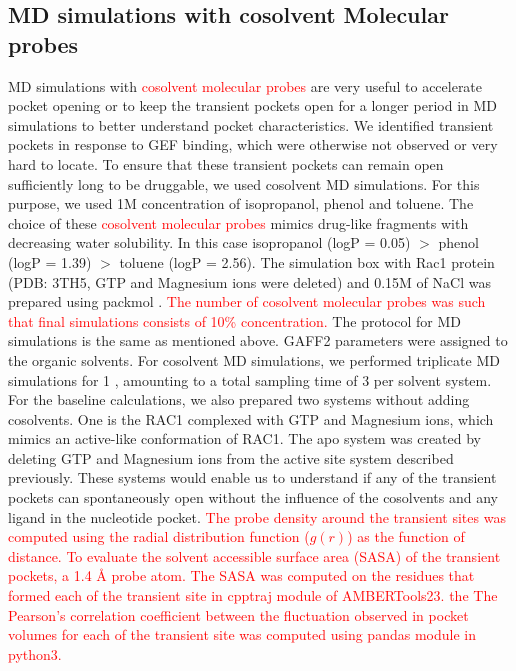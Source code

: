 \documentclass[12pt,a4paper]{achemso}
\begin{document}
\subsection{MD simulations with cosolvent Molecular probes} 
MD simulations with \textcolor{red}{cosolvent molecular probes} are very useful to accelerate pocket opening or to keep the transient pockets open for a longer period in MD simulations to better understand pocket characteristics. We identified transient pockets in response to GEF binding, which were otherwise not observed or very hard to locate. To ensure that these transient pockets can remain open sufficiently long to be druggable, we used cosolvent MD simulations. For this purpose, we used 1M concentration of isopropanol, phenol and toluene. The choice of these \textcolor{red}{cosolvent molecular probes} mimics drug-like fragments with decreasing water solubility. In this case isopropanol (logP = 0.05) $>$ phenol (logP = 1.39)  $>$ toluene (logP = 2.56). The simulation box with Rac1 protein (PDB: 3TH5, GTP and Magnesium ions were deleted) and 0.15M of NaCl was prepared using packmol \cite{martinez2009packmol}. \textcolor{red}{The number of cosolvent molecular probes was such that final simulations consists of 10\% concentration.} The protocol for MD simulations is the same as mentioned above. GAFF2 parameters were assigned to the organic solvents. For cosolvent MD simulations, we performed triplicate MD simulations for 1 ,  amounting to a total sampling time of 3  per solvent system. For the baseline calculations, we also prepared two systems without adding cosolvents.  One is the RAC1 complexed with GTP and Magnesium ions, which mimics an active-like conformation of RAC1. The apo system was created by deleting GTP and Magnesium ions from the active site system described previously. These systems would enable us to understand if any of the transient pockets can spontaneously open without the influence of the cosolvents and any ligand in the nucleotide pocket. \textcolor{red}{The probe density around the transient sites was computed using the radial distribution function ($g(r)$) as the function of distance. To evaluate the solvent accessible surface area (SASA) of the transient pockets, a 1.4 \r{A} probe atom. The SASA was computed on the residues that formed each of the transient site in cpptraj module of AMBERTools23. the The Pearson's correlation coefficient between the fluctuation observed in pocket volumes for each of the transient site was computed using pandas module in python3.}
\end{document}
